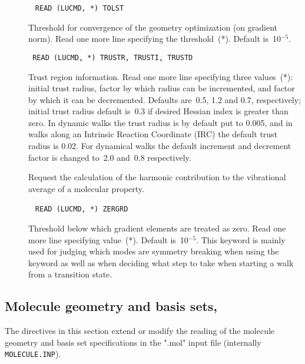 \begin{description}
\item[]\verb| |\newline
\verb|READ (LUCMD, *) TOLST|

Threshold for convergence of the geometry optimization (on gradient
norm).  Read one more line specifying the threshold~(*).  Default
is~10$^{-5}$.

\item[]\verb| |\newline
\verb|READ (LUCMD, *) TRUSTR, TRUSTI, TRUSTD|

Trust region information.  Read one more
line specifying three values~(*): initial trust radius, factor by
which radius can be incremented, and factor by which it can be
decremented.  Defaults are~0.5, 1.2 and 0.7, respectively; initial
trust radius default is~0.3 if desired Hessian index is
greater than zero. In dynamic walks the trust radius
is by default put
to 0.005, and in walks along an Intrinsic Reaction Coordinate
(IRC) the
default trust radius is 0.02. For dynamical walks the default
increment and decrement factor is changed to~2.0 and~0.8
respectively.

\item[]
Request the calculation of the harmonic contribution to the
vibrational average of a molecular property.


\item[]\verb| |\newline
\verb|READ (LUCMD, *) ZERGRD|

Threshold below which gradient elements are
treated as zero.  Read one more line specifying value~(*). Default
is~10$^{-5}$. This keyword is mainly used for judging which modes are
symmetry breaking when using the keyword  as well as
when deciding what step to take when starting a walk from a transition
state.
\end{description}

\subsection{Molecule geometry and basis sets, }\label{sec:herrdn}

The directives in this section extend or modify the reading of the molecule geometry and basis set
specifications in the ".mol" input file (internally \verb|MOLECULE.INP|).

